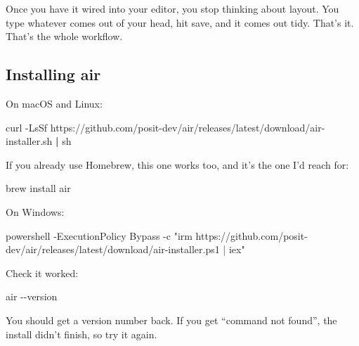 \documentclass[
  letterpaper,
  justified,
  a4paper]{tufte-book}
\makeatletter
\newenvironment{Shaded}{\begin{snugshade}}{\end{snugshade}}
\newcommand{\AttributeTok}[1]{\textcolor[rgb]{0.40,0.45,0.13}{#1}}
\newcommand{\ExtensionTok}[1]{\textcolor[rgb]{0.00,0.23,0.31}{#1}}
\newcommand{\FunctionTok}[1]{\textcolor[rgb]{0.28,0.35,0.67}{#1}}
\newcommand{\KeywordTok}[1]{\textcolor[rgb]{0.00,0.23,0.31}{\textbf{#1}}}
\newcommand{\NormalTok}[1]{\textcolor[rgb]{0.00,0.23,0.31}{#1}}
\newcommand{\OperatorTok}[1]{\textcolor[rgb]{0.37,0.37,0.37}{#1}}
\newcommand{\StringTok}[1]{\textcolor[rgb]{0.13,0.47,0.30}{#1}}
\let\rbporigShaded\Shaded
\let\rbporigendShaded\endShaded
\renewenvironment{Shaded}{%
  \begingroup
  \ifdim\linewidth=\rbpbodywidth
    \advance\linewidth by \@tufte@overhang
    \advance\hsize by \@tufte@overhang
    \advance\columnwidth by \@tufte@overhang
  \fi
  \rbporigShaded
}{%
  \rbporigendShaded
  \endgroup
}
\makeatother
\begin{document}
Once you have it wired into your editor, you stop thinking about layout.
You type whatever comes out of your head, hit save, and it comes out
tidy. That's it. That's the whole workflow.

\subsection{Installing air}\label{installing-air}

On macOS and Linux:

\begin{Shaded}
\begin{Highlighting}[]
\ExtensionTok{curl} \AttributeTok{{-}LsSf}\NormalTok{ https://github.com/posit{-}dev/air/releases/latest/download/air{-}installer.sh }\KeywordTok{|} \FunctionTok{sh}
\end{Highlighting}
\end{Shaded}

If you already use Homebrew, this one works too, and it's the one I'd
reach for:

\begin{Shaded}
\begin{Highlighting}[]
\ExtensionTok{brew}\NormalTok{ install air}
\end{Highlighting}
\end{Shaded}

On Windows:

\begin{Shaded}
\begin{Highlighting}[]
\NormalTok{powershell }\OperatorTok{{-}}\NormalTok{ExecutionPolicy Bypass }\OperatorTok{{-}}\NormalTok{c }\StringTok{"irm https://github.com/posit{-}dev/air/releases/latest/download/air{-}installer.ps1 | iex"}
\end{Highlighting}
\end{Shaded}

Check it worked:

\begin{Shaded}
\begin{Highlighting}[]
\ExtensionTok{air} \AttributeTok{{-}{-}version}
\end{Highlighting}
\end{Shaded}

You should get a version number back. If you get ``command not found'',
the install didn't finish, so try it again.
\end{document}

